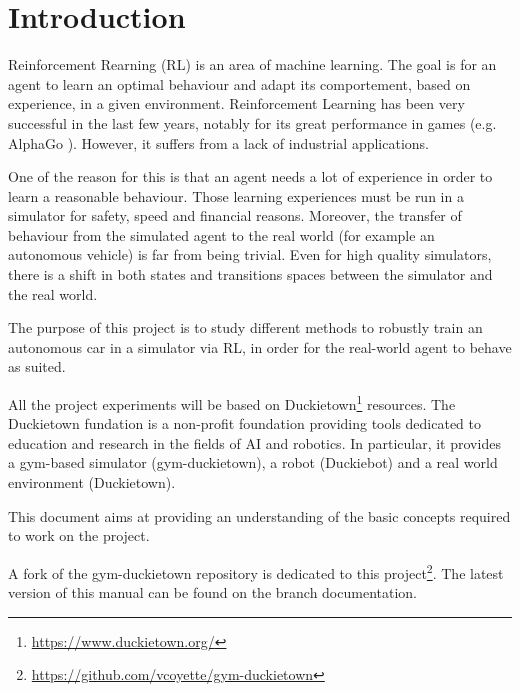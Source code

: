 \chapter*{Introduction}

Reinforcement Rearning (RL) is an area of machine learning.
The goal is for an agent to learn an optimal behaviour and adapt its comportement, based on experience, in a given environment.
Reinforcement Learning has been very successful in the last few years, notably for its great performance in games (e.g. AlphaGo \cite{rlgames}).
However, it suffers from a lack of industrial applications.

One of the reason for this is that an agent needs a lot of experience in order to learn a reasonable behaviour.
Those learning experiences must be run in a simulator for safety, speed and financial reasons.
Moreover, the transfer of behaviour from the simulated agent to the real world (for example an autonomous vehicle) is far from being trivial.
Even for high quality simulators, there is a shift in both states and transitions spaces between the simulator and the real world.

The purpose of this project is to study different methods to robustly train an autonomous car in a simulator via RL, in order for the real-world agent to behave as suited.

All the project experiments will be based on Duckietown\footnote{\url{https://www.duckietown.org/}} resources.
The Duckietown fundation is a non-profit foundation providing tools dedicated to education and research in the fields of AI and robotics.
In particular, it provides a gym-based simulator (gym-duckietown), a robot (Duckiebot) and a real world environment (Duckietown).

This document aims at providing an understanding of the basic concepts required to work on the project.


A fork of the gym-duckietown repository is dedicated to this project\footnote{\url{https://github.com/vcoyette/gym-duckietown}}.
The latest version of this manual can be found on the branch documentation.


